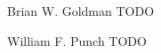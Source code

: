 \documentclass[journal]{IEEEtran}
\begin{document}


%
%
%






% 

\begin{IEEEbiography}{Brian W. Goldman}
TODO
\end{IEEEbiography}

\begin{IEEEbiographynophoto}{William F. Punch}
TODO
\end{IEEEbiographynophoto}







\end{document}
